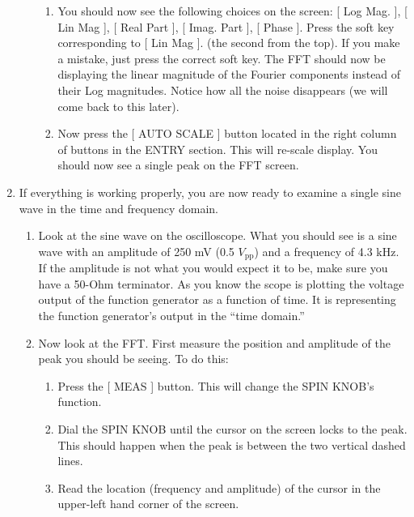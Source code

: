 \documentclass{../lab}
\begin{document}
\begin{enumerate}
\begin{enumerate}
\begin{enumerate}
            \item You should now see the following choices on the screen: [ Log Mag. ], [ Lin Mag ], [ Real Part ], [ Imag. Part ], [ Phase ]. Press the soft key corresponding to [ Lin Mag ]. (the second from the top). If you make a mistake, just press the correct soft key. The FFT should now be displaying the linear magnitude of the Fourier components instead of their Log magnitudes. Notice how all the noise disappears (we will come back to this later).

            \item Now press the [ AUTO SCALE ] button located in the right column of buttons in the ENTRY section. This will re-scale display. You should now see a single peak on the FFT screen.

        \end{enumerate}

    \end{enumerate}

    \item If everything is working properly, you are now ready to examine a single sine wave in the time and frequency domain.
    \begin{enumerate}
        \item Look at the sine wave on the oscilloscope. What you should see is a sine wave with an amplitude of 250 mV (0.5 $V_\text{pp}$) and a frequency of 4.3 kHz. If the amplitude is not what you would expect it to be, make sure you have a 50-Ohm terminator. As you know the scope is plotting the voltage output of the function generator as a function of time. It is representing the function generator's output in the ``time domain.''

        \item Now look at the FFT. First measure the position and amplitude of the peak you should be seeing. To do this:
        \begin{enumerate}
            \item Press the [ MEAS ] button. This will change the SPIN KNOB's function.

            \item Dial the SPIN KNOB until the cursor on the screen locks to the peak. This should happen when the peak is between the two vertical dashed lines.

            \item Read the location (frequency and amplitude) of the cursor in the upper-left hand corner of the screen.


\end{enumerate}
\end{enumerate}
\end{enumerate}
\end{document}
